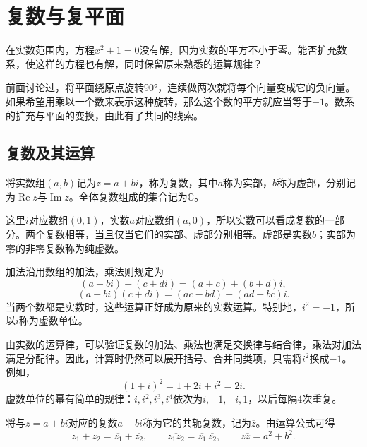 \section{复数与复平面}
在实数范围内，方程\(x^{2} + 1 = 0\)没有解，因为实数的平方不小于零。能否扩充数系，使这样的方程也有解，同时保留原来熟悉的运算规律？

前面讨论过，将平面绕原点旋转90°，连续做两次就将每个向量变成它的负向量。如果希望用乘以一个数来表示这种旋转，那么这个数的平方就应当等于\(- 1\)。数系的扩充与平面的变换，由此有了共同的线索。

\subsection{复数及其运算}
\begin{definition}\label{def:complex-number}
将实数组\(\left( a , b \right)\)记为\(z = a + b i\)，称为复数，其中\(a\)称为实部，\(b\)称为虚部，分别记为\(\operatorname{Re} z\)与\(\operatorname{Im} z\)。全体复数组成的集合记为\(\mathbb{C}\)。
\end{definition}

这里\(i\)对应数组\(\left( 0 , 1 \right)\)，实数\(a\)对应数组\(\left( a , 0 \right)\)，所以实数可以看成复数的一部分。两个复数相等，当且仅当它们的实部、虚部分别相等。虚部是实数\(b\)；实部为零的非零复数称为{\heiti{}纯虚数}。

加法沿用数组的加法，乘法则规定为
\begin{equation}
    \left( a + b i \right) + \left( c + d i \right) = \left( a + c \right) + \left( b + d \right) i ,
\end{equation}
\begin{equation}\label{eq:complex-product}
    \left( a + b i \right) \left( c + d i \right) = \left( a c - b d \right) + \left( a d + b c \right) i .
\end{equation}
当两个数都是实数时，这些运算正好成为原来的实数运算。特别地，\(i^{2} = - 1\)，所以\(i\)称为{\heiti{}虚数单位}。

由实数的运算律，可以验证复数的加法、乘法也满足交换律与结合律，乘法对加法满足分配律。因此，计算时仍然可以展开括号、合并同类项，只需将\(i^{2}\)换成\(- 1\)。例如，
\begin{equation}
    \left( 1 + i \right)^{2} = 1 + 2 i + i^{2} = 2 i .
\end{equation}
虚数单位的幂有简单的规律：\(i , i^{2} , i^{3} , i^{4}\)依次为\(i , - 1 , - i , 1\)，以后每隔\(4\)次重复。

将与\(z = a + b i\)对应的复数\(a - b i\)称为它的{\heiti{}共轭复数}，记为\(\overline{z}\)。由运算公式可得
\begin{equation}
    \overline{z_{1} + z_{2}} = \overline{z_{1}} + \overline{z_{2}} , \qquad
    \overline{z_{1} z_{2}} = \overline{z_{1}} \, \overline{z_{2}} , \qquad
    z \overline{z} = a^{2} + b^{2} .
\end{equation}

